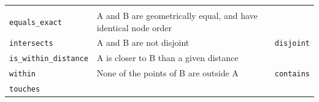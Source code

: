 \documentclass[]{book}
\begin{document}
\begin{longtable}[]{@{}lll@{}}
\begin{minipage}[t]{0.54\columnwidth}
\end{minipage} & \begin{minipage}[t]{0.13\columnwidth}\raggedright
\strut
\end{minipage}\tabularnewline
\begin{minipage}[t]{0.23\columnwidth}\raggedright
\texttt{equals\_exact}\strut
\end{minipage} & \begin{minipage}[t]{0.54\columnwidth}\raggedright
A and B are geometrically equal, and have identical node order\strut
\end{minipage} & \begin{minipage}[t]{0.13\columnwidth}\raggedright
\strut
\end{minipage}\tabularnewline
\begin{minipage}[t]{0.23\columnwidth}\raggedright
\texttt{intersects}\strut
\end{minipage} & \begin{minipage}[t]{0.54\columnwidth}\raggedright
A and B are not disjoint\strut
\end{minipage} & \begin{minipage}[t]{0.13\columnwidth}\raggedright
\texttt{disjoint}\strut
\end{minipage}\tabularnewline
\begin{minipage}[t]{0.23\columnwidth}\raggedright
\texttt{is\_within\_distance}\strut
\end{minipage} & \begin{minipage}[t]{0.54\columnwidth}\raggedright
A is closer to B than a given distance\strut
\end{minipage} & \begin{minipage}[t]{0.13\columnwidth}\raggedright
\strut
\end{minipage}\tabularnewline
\begin{minipage}[t]{0.23\columnwidth}\raggedright
\texttt{within}\strut
\end{minipage} & \begin{minipage}[t]{0.54\columnwidth}\raggedright
None of the points of B are outside A\strut
\end{minipage} & \begin{minipage}[t]{0.13\columnwidth}\raggedright
\texttt{contains}\strut
\end{minipage}\tabularnewline
\begin{minipage}[t]{0.23\columnwidth}\raggedright
\texttt{touches}\strut
\end{minipage} & \begin{minipage}[t]{0.54\columnwidth}\raggedright

\end{minipage}
\end{longtable}
\end{document}
